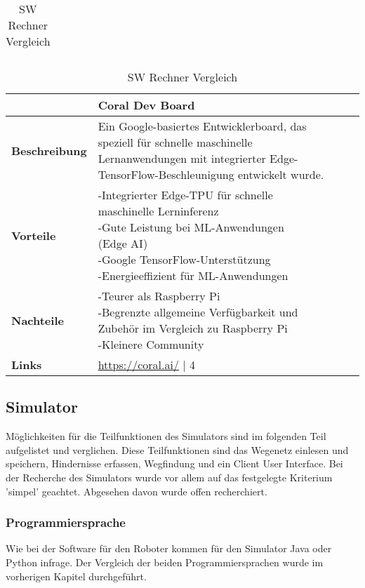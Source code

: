 \begin{table}[H]
\begin{tabularx}{\textwidth}{|l|X|X|}
  \hline
\end{tabularx}
\begin{tabularx}{\textwidth}{|l|X|X|}
\hline
\textbf{} & \textbf{Coral Dev Board} & \textbf{} \\
  \hline
  \textbf{Beschreibung} & Ein Google-basiertes Entwicklerboard, das speziell für schnelle maschinelle Lernanwendungen mit integrierter Edge-TensorFlow-Beschleunigung entwickelt wurde. & \\
  \hline
  \textbf{Vorteile}  & \makecell{
  -Integrierter Edge-TPU für schnelle\\maschinelle Lerninferenz \\
  -Gute Leistung bei ML-Anwendungen\\(Edge AI) \\
  -Google TensorFlow-Unterstützung \\
  -Energieeffizient für ML-Anwendungen
  } & \makecell{} \\
  \hline
  \textbf{Nachteile} & \makecell{
  -Teurer als Raspberry Pi \\
  -Begrenzte allgemeine Verfügbarkeit und\\Zubehör im Vergleich zu Raspberry Pi \\
  -Kleinere Community
  } & \makecell{} \\
  \hline
  \textbf{Links} & \url{https://coral.ai/} | 4 & \\
  \hline
\end{tabularx}
\caption{SW Rechner Vergleich}
\label{table:sw-pc-compare}
\end{table}


\subsection{Simulator}

Möglichkeiten für die Teilfunktionen des Simulators sind im folgenden Teil aufgelistet und verglichen. Diese Teilfunktionen sind das Wegenetz einlesen und speichern, Hindernisse erfassen, Wegfindung und ein Client User Interface.
Bei der Recherche des Simulators wurde vor allem auf das festgelegte Kriterium 'simpel' geachtet. Abgesehen davon wurde offen recherchiert.

\subsubsection{Programmiersprache}

Wie bei der Software für den Roboter kommen für den Simulator Java oder Python infrage. Der Vergleich der beiden Programmiersprachen wurde im vorherigen Kapitel durchgeführt.

